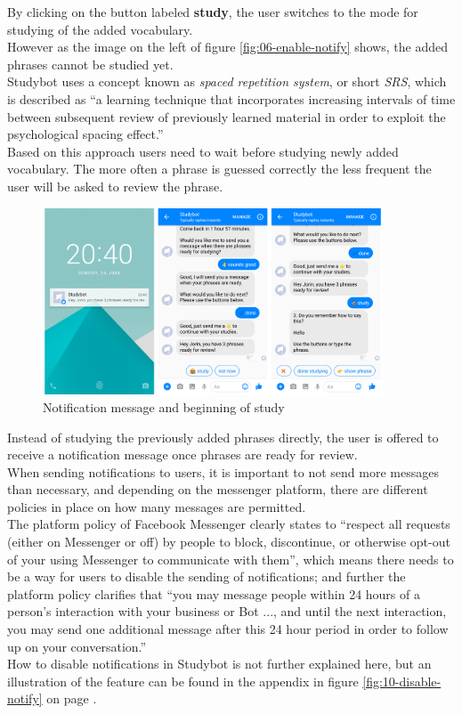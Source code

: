 By clicking on the button labeled \textbf{study},
the user switches to the mode for studying of the added vocabulary.
\\
However as the image on the left of figure \ref{fig:06-enable-notify} shows,
the added phrases cannot be studied yet.
\\

Studybot uses a concept known as \emph{spaced repetition system}, or short \emph{SRS},
which is described as ``a learning technique that incorporates increasing intervals of time between subsequent review of previously learned material in order to exploit the psychological spacing effect.''\cite{srs}
\\
Based on this approach users need to wait before studying newly added vocabulary.
The more often a phrase is guessed correctly the less frequent the user will be asked to review the phrase.
\\

\begin{figure}[h]
  \centering
  \includegraphics[width=0.9\textwidth]{images/interface/07-notify-study.png}
	\caption{Notification message and beginning of study}
	\label{fig:07-notify-study}
\end{figure}

Instead of studying the previously added phrases directly,
the user is offered to receive a notification message once phrases are ready for review.
\\

When sending notifications to users, it is important to not send more messages than necessary,
and depending on the messenger platform, there are different policies in place on how many messages are permitted.
\\
The platform policy of Facebook Messenger clearly states to
``respect all requests (either on Messenger or off) by people to block, discontinue, or otherwise opt-out of your using Messenger to communicate with them''\cite{fbpolicy},
which means there needs to be a way for users to disable the sending of notifications;
and further the platform policy clarifies that ``you may message people within 24 hours of a person's interaction with your business or Bot ..., and until the next interaction, you may send one additional message after this 24 hour period in order to follow up on your conversation.''\cite{fbpolicy}
\\
How to disable notifications in Studybot is not further explained here,
but an illustration of the feature can be found in the appendix in figure \ref{fig:10-disable-notify} on page \pageref{fig:10-disable-notify}.
\\

